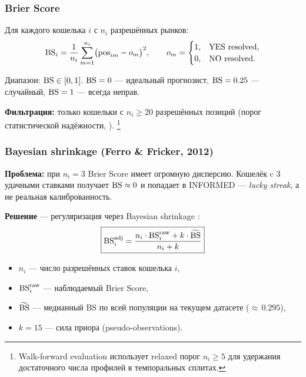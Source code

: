 \subsubsection{Brier Score}

Для каждого кошелька $i$ с $n_i$ разрешённых рынков:
\begin{equation}
\label{eq:brier}
\mathrm{BS}_i = \frac{1}{n_i} \sum_{m=1}^{n_i} \bigl(\mathrm{pos}_{im} - o_m\bigr)^2, \qquad
o_m = \begin{cases} 1, & \text{YES resolved}, \\ 0, & \text{NO resolved}. \end{cases}
\end{equation}

Диапазон: $\mathrm{BS} \in [0, 1]$.
$\mathrm{BS} = 0$ --- идеальный прогнозист, $\mathrm{BS} = 0.25$ --- случайный, $\mathrm{BS} = 1$ --- всегда неправ.

\textbf{Фильтрация:} только кошельки с $n_i \geq 20$ разрешённых позиций (порог статистической надёжности, \citealt{satopaa2014combining}).%
\footnote{Walk-forward evaluation использует relaxed порог $n_i \geq 5$ для удержания достаточного числа профилей в темпоральных сплитах.}

\subsubsection{Bayesian shrinkage (Ferro \& Fricker, 2012)}
\label{sec:shrinkage_bs}

\textbf{Проблема:} при $n_i = 3$ Brier Score имеет огромную дисперсию.
Кошелёк c 3 удачными ставками получает $\mathrm{BS} \approx 0$ и попадает в INFORMED --- \emph{lucky streak},
а не реальная калиброванность.

\textbf{Решение} --- регуляризация через Bayesian shrinkage \citep{ferro2012sampling}:
\begin{equation}
\label{eq:shrinkage}
\boxed{
\mathrm{BS}_i^{\mathrm{adj}} = \frac{n_i \cdot \mathrm{BS}_i^{\mathrm{raw}} + k \cdot \widetilde{\mathrm{BS}}}{n_i + k}
}
\end{equation}

\begin{itemize}[nosep]
  \item $n_i$ --- число разрешённых ставок кошелька $i$,
  \item $\mathrm{BS}_i^{\mathrm{raw}}$ --- наблюдаемый Brier Score,
  \item $\widetilde{\mathrm{BS}}$ --- медианный BS по всей популяции на текущем датасете (${\approx}\,0.295$),
  \item $k = 15$ --- сила приора (pseudo-observations).
\end{itemize}

